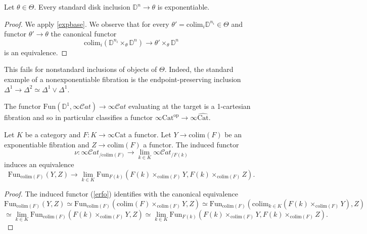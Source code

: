\documentclass[10pt,oneside]{article}
\numberwithin{equation}{section} %
\numberwithin{figure}{section} %
\theoremstyle{plain}
\theoremstyle{definition}
\newcommand{\bD}{{\mathbb D}}
\newcommand{\op}{\mathrm{op}}
\newcommand{\colim}{\mathrm{colim}}
\newcommand{\Cat}{\mathrm{Cat}}
\newcommand{\Fun}{\mathrm{Fun}}
\newcommand{\scat}{\mathcal{C}\mathit{at}}
\begin{document}
\begin{corollary}\label{standardexp}

Let $\theta \in \Theta.$
Every standard disk inclusion $\bD^n \to \theta $ is exponentiable.
    
\end{corollary}

\begin{proof}
We apply \cref{expbase}. We observe that for every $\theta'=\colim_i\bD^{n_i} \in \Theta$ and functor $\theta' \to \theta$ the canonical functor
$$\colim_i(\bD^{n_i} \times_{\theta} \bD^n) \to \theta' \times_{\theta} \bD^n $$
is an equivalence.   
\end{proof}

\begin{remark}
This fails for nonstandard inclusions of objects of $\Theta$.
Indeed, the standard example of a nonexponentiable fibration is the endpoint-preserving inclusion $\Delta^1\to\Delta^2\simeq\Delta^1\vee\Delta^1$.
\end{remark}

The functor $\Fun(\bD^1, \infty\scat) \to \infty\scat$ evaluating at the target is a 1-cartesian fibration and so in particular classifies a functor $\infty\Cat^\op \to \infty\widehat{\Cat}.$


\begin{lemma}\label{expful} Let $K$ be a category and $F: K \to \infty\Cat$ a functor. Let $Y \to \colim(F)$ be 
an exponentiable fibration and $Z \to \colim(F)$ a functor.
The induced functor
$$\nu: \infty\scat_{/\colim(F)} \to \lim_{k \in K} \infty\scat_{/F(k)} $$
induces an equivalence 
\begin{equation}\label{erfo}
\Fun_{\colim(F)}(Y, Z) \to \lim_{k \in K} \Fun_{F(k)}(F(k) \times_{\colim(F)} Y, F(k) \times_{\colim(F)} Z). \end{equation}

\end{lemma}

\begin{proof}

The induced functor (\ref{erfo}) identifies with the canonical equivalence
$$ \Fun_{\colim(F)}(Y, Z) \simeq \Fun_{\colim(F)}(\colim(F) \times_{\colim(F)} Y, Z) \simeq \Fun_{\colim(F)}(\colim_{k \in K}(F(k) \times_{\colim(F)} Y), Z) $$$$ \simeq \lim_{k \in K} \Fun_{\colim(F)}(F(k) \times_{\colim(F)} Y, Z) \simeq \lim_{k \in K} \Fun_{F(k)}(F(k) \times_{\colim(F)} Y, F(k) \times_{\colim(F)} Z).$$
\end{proof}
\end{document}
